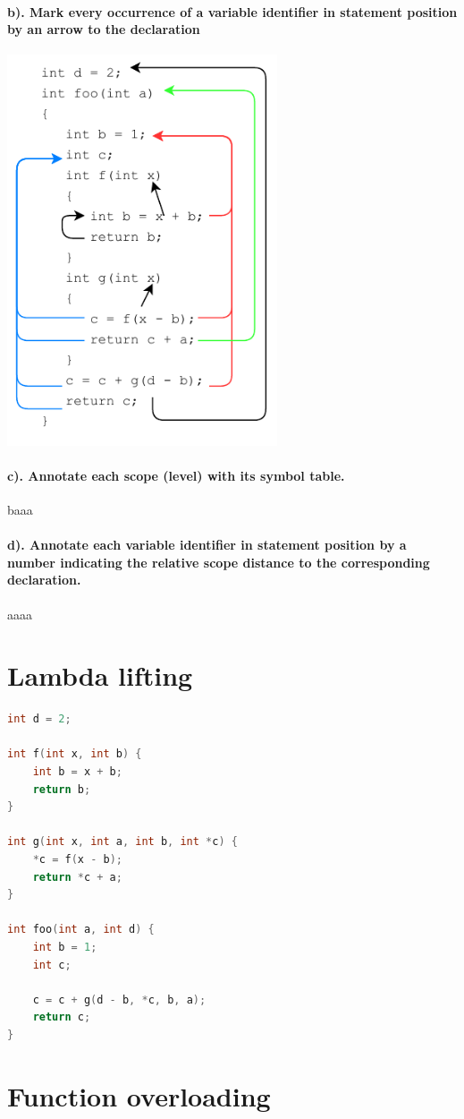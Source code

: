\documentclass[hidelinks]{uva-inf-article}
\begin{document}
\begin{flushleft}
\paragraph{b). Mark every occurrence of a variable identifier in statement position by an arrow to the declaration\\}
\includegraphics[width=8cm]{images/1b.pdf}
\paragraph{c). Annotate each scope (level) with its symbol table.\\}
baaa
\paragraph{d). Annotate each variable identifier in statement position by a number indicating the relative scope distance to the corresponding declaration.\\}
aaaa
\newpage
\section{Lambda lifting}
\begin{lstlisting}[basicstyle=\small, language=C]
int d = 2;

int f(int x, int b) {
	int b = x + b;
	return b;
}

int g(int x, int a, int b, int *c) {
	*c = f(x - b);
	return *c + a;
}

int foo(int a, int d) {
	int b = 1;
	int c;

	c = c + g(d - b, *c, b, a);
	return c;
}
\end{lstlisting}
\section{Function overloading}

\end{flushleft}
\end{document}

